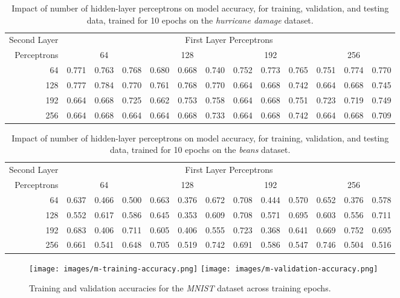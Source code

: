 \documentclass{article}
\begin{document}
\begin{table}[h!]
	\centering
	\caption{Impact of number of hidden-layer perceptrons on model accuracy, for training, validation, and testing data, trained for 10 epochs on the \emph{hurricane damage} dataset.}
	\label{tbl:h-2l}
	\begin{tabular}{r|ccc|ccc|ccc|ccc}
		Second Layer & \multicolumn{12}{c}{First Layer Perceptrons} \\
		Perceptrons & \multicolumn{3}{c}{64} & \multicolumn{3}{c}{128} & \multicolumn{3}{c}{192} & \multicolumn{3}{c}{256} \\
		\hline
		64 & 0.771 & 0.763 & 0.768 & 0.680 & 0.668 & 0.740 & 0.752 & 0.773 & 0.765 & 0.751 & 0.774 & 0.770 \\
		128 & 0.777 & 0.784 & 0.770 & 0.761 & 0.768 & 0.770 & 0.664 & 0.668 & 0.742 & 0.664 & 0.668 & 0.745 \\
		192 & 0.664 & 0.668 & 0.725 & 0.662 & 0.753 & 0.758 & 0.664 & 0.668 & 0.751 & 0.723 & 0.719 & 0.749 \\
		256 & 0.664 & 0.668 & 0.664 & 0.664 & 0.668 & 0.733 & 0.664 & 0.668 & 0.742 & 0.664 & 0.668 & 0.709
	\end{tabular}
\end{table}

\begin{table}[h!]
	\centering
	\caption{Impact of number of hidden-layer perceptrons on model accuracy, for training, validation, and testing data, trained for 10 epochs on the \emph{beans} dataset.}
	\label{tbl:b-2l}
	\begin{tabular}{r|ccc|ccc|ccc|ccc}
		Second Layer & \multicolumn{12}{c}{First Layer Perceptrons} \\
		Perceptrons & \multicolumn{3}{c}{64} & \multicolumn{3}{c}{128} & \multicolumn{3}{c}{192} & \multicolumn{3}{c}{256} \\
		\hline
		64 & 0.637 & 0.466 & 0.500 & 0.663 & 0.376 & 0.672 & 0.708 & 0.444 & 0.570 & 0.652 & 0.376 & 0.578 \\
		128 & 0.552 & 0.617 & 0.586 & 0.645 & 0.353 & 0.609 & 0.708 & 0.571 & 0.695 & 0.603 & 0.556 & 0.711 \\
		192 & 0.683 & 0.406 & 0.711 & 0.605 & 0.406 & 0.555 & 0.723 & 0.368 & 0.641 & 0.669 & 0.752 & 0.695 \\
		256 & 0.661 & 0.541 & 0.648 & 0.705 & 0.519 & 0.742 & 0.691 & 0.586 & 0.547 & 0.746 & 0.504 & 0.516
	\end{tabular}
\end{table}

\begin{figure}[h!]
	\centering
	\texttt{[image: images/m-training-accuracy.png]}
	\texttt{[image: images/m-validation-accuracy.png]}
	\caption{Training and validation accuracies for the \emph{MNIST} dataset across training epochs.}
	\label{fig:m-2l}
\end{figure}
\end{document}
